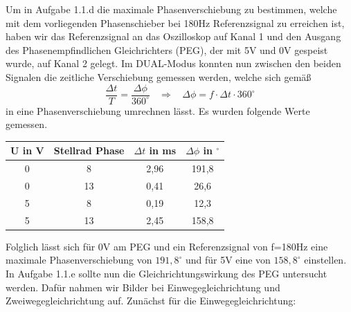 \documentclass{scrartcl}						%
\begin{document}
			Um in Aufgabe 1.1.d die maximale Phasenverschiebung zu bestimmen, welche mit dem vorliegenden Phasenschieber bei 180Hz Referenzsignal zu erreichen ist, haben wir das Referenzsignal an das Oszilloskop auf Kanal 1 und den Ausgang des Phasenempfindlichen Gleichrichters (PEG), der mit 5V und 0V gespeist wurde, auf Kanal 2 gelegt. Im DUAL-Modus konnten nun zwischen den beiden Signalen die zeitliche Verschiebung gemessen werden, welche sich gemäß 
			\begin{equation*}
				\frac{\Delta t}{T}=\frac{\Delta \phi}{360^\circ} \ \ \ \ \Rightarrow \ \ \ \ \Delta \phi=f\cdot \Delta t \cdot 360^\circ
			\end{equation*}
			in eine Phasenverschiebung umrechnen lässt. Es wurden folgende Werte gemessen.
			\center
			\begin{tabular}{|c|c|c|c|}
			\hline U in V & Stellrad Phase & $\Delta t$ in ms & $ \Delta \phi$ in $^\circ$ \\ 
			\hline 0 & 8 & 2,96 & 191,8 \\ 
			\hline 0 & 13 & 0,41 & 26,6 \\ 
			\hline 5 & 8 & 0,19 & 12,3 \\ 
			\hline 5 & 13 & 2,45 & 158,8 \\ 
			\hline 
			\end{tabular} 
			\flushleft
			Folglich lässt sich für 0V am PEG und ein Referenzsignal von f=180Hz eine maximale Phasenverschiebung von $ 191,8^\circ $ und für 5V eine von $ 158,8^\circ $ einstellen.\\
			
			In Aufgabe 1.1.e sollte nun die Gleichrichtungswirkung des PEG untersucht werden. Dafür nahmen wir Bilder bei Einwegegleichrichtung und Zweiwegegleichrichtung auf.
			\clearpage
			Zunächst für die Einwegegleichrichtung:
			
\end{document}
